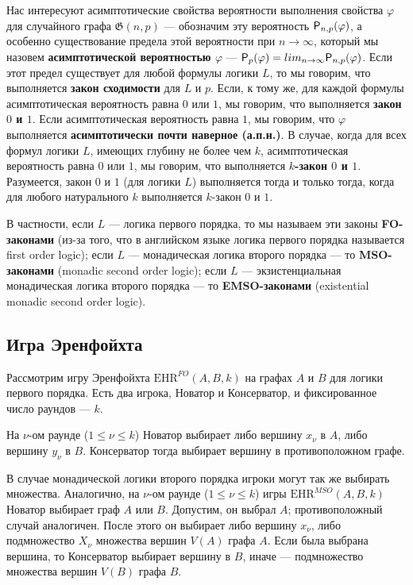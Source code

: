 \documentclass{article}
\begin{document}
	Нас интересуют асимптотические свойства вероятности выполнения свойства $\varphi$ для случайного графа $\mathfrak{G}(n, p)$ --- обозначим эту вероятность ${\sf P}_{n, p}(\varphi)$, а особенно существование предела этой вероятности при $n \rightarrow \infty$, который мы назовем {\bf асимптотической вероятностью $\varphi$} --- ${\sf P}_{p} (\varphi) = lim_{n \rightarrow \infty} {\sf P}_{n, p} (\varphi)$. Если этот предел существует для любой формулы логики $L$, то мы говорим, что выполняется {\bf закон сходимости} для $L$ и $p$. Если, к тому же, для каждой формулы асимптотическая вероятность равна $0$ или $1$, мы говорим, что выполняется {\bf закон $0$ и $1$}. Если асимптотическая вероятность равна $1$, мы говорим, что $\varphi$ выполняется {\bf асимптотически почти наверное (а.п.н.)}. В случае, когда для всех формул логики $L$, имеющих глубину не более чем $k$, асимптотическая вероятность равна $0$ или $1$, мы говорим, что выполняется {\bf $k$-закон $0$ и $1$}. Разумеется, закон $0$ и $1$ (для логики $L$) выполняется тогда и только тогда, когда для любого натурального $k$ выполняется $k$-закон $0$ и $1$.
	
	В частности, если $L$ --- логика первого порядка, то мы называем эти законы {\bf FO-законами} (из-за того, что в английском языке логика первого порядка называется first order logic); если $L$ --- монадическая логика второго порядка --- то {\bf MSO-законами} (monadic second order logic); если $L$ --- экзистенциальная монадическая логика второго порядка --- то {\bf EMSO-законами} (existential monadic second order logic).
	
	\subsection{Игра Эренфойхта}
	Рассмотрим игру Эренфойхта $\textrm{EHR}^{FO}(A, B, k)$ на графах $A$ и $B$ для логики первого порядка. Есть два игрока, Новатор и Консерватор, и фиксированное число раундов --- $k$.
	
	На $\nu$-ом раунде ($1 \leq \nu \leq k$) Новатор выбирает либо вершину $x_\nu$ в $A$, либо вершину $y_\nu$ в $B$. Консерватор тогда выбирает вершину в противоположном графе.
	
	В случае монадической логики второго порядка игроки могут так же выбирать множества. Аналогично, на $\nu$-ом раунде ($1 \leq \nu \leq k$) игры $\textrm{EHR}^{MSO}(A, B, k)$ Новатор выбирает граф $A$ или $B$. Допустим, он выбрал $A$; противоположный случай аналогичен. После этого он выбирает либо вершину $x_\nu$, либо подмножество $X_\nu$ множества вершин $V(A)$ графа $A$. Если была выбрана вершина, то Консерватор выбирает вершину в $B$, иначе --- подмножество множества вершин $V(B)$ графа $B$.
	
\end{document}
